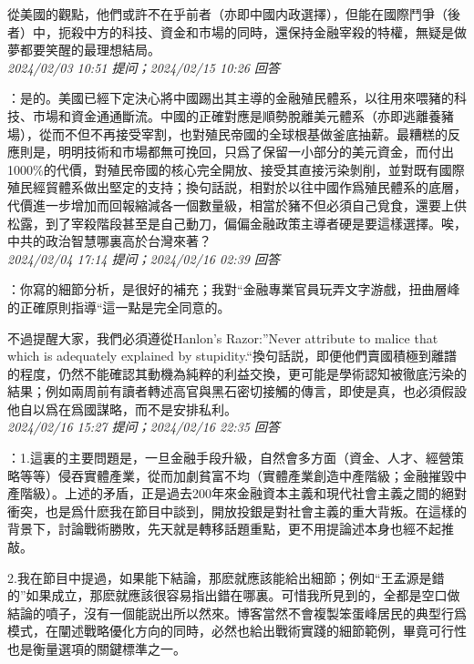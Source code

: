 \documentclass[twocolumn]{ctexart}
\begin{document}
從美國的觀點，他們或許不在乎前者（亦即中國内政選擇），但能在國際鬥爭（後者）中，扼殺中方的科技、資金和市場的同時，還保持金融宰殺的特權，無疑是做夢都要笑醒的最理想結局。
\\

\textit{\hfill\noindent\small 2024/02/03 10:51 提问；2024/02/15 10:26 回答}

：是的。美國已經下定決心將中國踢出其主導的金融殖民體系，以往用來喂豬的科技、市場和資金通通斷流。中國的正確對應是順勢脫離美元體系（亦即逃離養豬場），從而不但不再接受宰割，也對殖民帝國的全球根基做釜底抽薪。最糟糕的反應則是，明明技術和市場都無可挽回，只爲了保留一小部分的美元資金，而付出1000\%的代價，對殖民帝國的核心完全開放、接受其直接污染剝削，並對既有國際殖民經貿體系做出堅定的支持；換句話説，相對於以往中國作爲殖民體系的底層，代價進一步增加而回報縮減各一個數量級，相當於豬不但必須自己覓食，還要上供松露，到了宰殺階段甚至是自己動刀，偏偏金融政策主導者硬是要這樣選擇。唉，中共的政治智慧哪裏高於台灣來著？
\\

\textit{\hfill\noindent\small 2024/02/04 17:14 提问；2024/02/16 02:39 回答}

：你寫的細節分析，是很好的補充；我對“金融專業官員玩弄文字游戲，扭曲層峰的正確原則指導“這一點是完全同意的。

不過提醒大家，我們必須遵從Hanlon's Razor:”Never attribute to malice that which is adequately explained by stupidity.“換句話説，即便他們賣國積極到離譜的程度，仍然不能確認其動機為純粹的利益交換，更可能是學術認知被徹底污染的結果；例如兩周前有讀者轉述高官與黑石密切接觸的傳言，即使是真，也必須假設他自以爲在爲國謀略，而不是安排私利。
\\

\textit{\hfill\noindent\small 2024/02/16 15:27 提问；2024/02/16 22:35 回答}

：1.這裏的主要問題是，一旦金融手段升級，自然會多方面（資金、人才、經營策略等等）侵吞實體產業，從而加劇貧富不均（實體產業創造中產階級；金融摧毀中產階級）。上述的矛盾，正是過去200年來金融資本主義和現代社會主義之間的絕對衝突，也是爲什麽我在節目中談到，開放投銀是對社會主義的重大背叛。在這樣的背景下，討論戰術勝敗，先天就是轉移話題重點，更不用提論述本身也經不起推敲。

2.我在節目中提過，如果能下結論，那麽就應該能給出細節；例如“王孟源是錯的”如果成立，那麽就應該很容易指出錯在哪裏。可惜我所見到的，全都是空口做結論的噴子，沒有一個能説出所以然來。博客當然不會複製笨蛋峰居民的典型行爲模式，在闡述戰略優化方向的同時，必然也給出戰術實踐的細節範例，畢竟可行性也是衡量選項的關鍵標準之一。
\\
\end{document}
